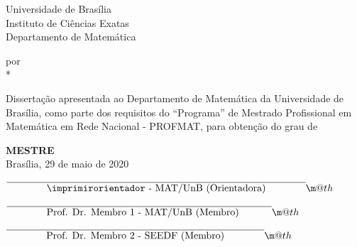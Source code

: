 \documentclass[12pt, openright, a4paper, brazil, english, french, spanish, bibjustif, openany, oneside]{abntex2}
\makeatletter
\newcommand*{\textoverline}[1]{$\overline{\hbox{#1}}\m@th$}
\makeatother
\begin{document}
\begin{folhadeaprovacao}

\begin{center}
 Universidade de Bras\'ilia \\
 Instituto de Ci\^encias Exatas \\
 Departamento de Matem\'atica
\end{center}
\begin{center}
    \vspace{0.3cm}
 \LARGE{\textbf{\imprimirtitulo}}
    \vspace{0.3cm}
\end{center}
\begin{center}
 por \\
    \vspace{0.5cm}
 \LARGE{\textbf{\imprimirautor}} *
\end{center}

    \vspace{0.5cm}
\noindent Disserta\c c\~ao apresentada ao Departamento de Matem\'atica da Universidade de Bras\'ilia,
como parte dos requisitos do ``Programa'' de Mestrado Profissional em Matem\'atica em Rede 
Nacional - PROFMAT, para obten\c c\~ao do grau de 
\begin{center}
    \vspace{0.2cm}
 \LARGE{\textbf{MESTRE}}\\
    \vspace{0.5cm}
 Bras\'ilia, 29 de maio de 2020
\end{center}

    \vspace{1.5cm}

\vspace*{8mm}

\textoverline{\phantom{xxxxxxx} \imprimirorientador - MAT/UnB (Orientadora)\phantom{xxxxxxx}  }

\vspace*{1cm}

\textoverline{\phantom{xxxxxxx} Prof. Dr. Membro 1 - MAT/UnB (Membro) \phantom{xxxxx} }

\vspace*{1cm}

\textoverline{\phantom{xxxxxxx} Prof. Dr. Membro 2 - SEEDF (Membro)\phantom{xxxxxxx}  }

\vspace*{1cm}

\vspace*{1cm}

\end{folhadeaprovacao}
\end{document}
